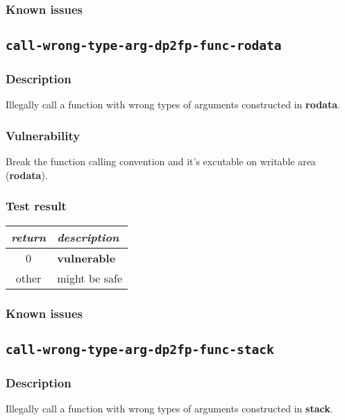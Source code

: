 \documentclass[a4paper]{book}
\begin{document}
\subsubsection{Known issues}

\newpage
\subsection{\texttt{call-wrong-type-arg-dp2fp-func-rodata}}\label{test-call-wrong-type-arg-dp2fp-func-rodata}

\subsubsection{Description}
Illegally call a function with wrong types of arguments constructed in \textbf{rodata}.

\subsubsection{Vulnerability}
Break the function calling convention and it’s excutable on writable area (\textbf{rodata}).

\subsubsection{Test result}
\begin{tabular}{cl}
  \toprule
  \emph{return}  & \emph{description} \\
  \midrule
  0              & \textbf{vulnerable} \\
  other          & might be safe \\
  \bottomrule
\end{tabular}

\subsubsection{Known issues}

\newpage

\subsection{\texttt{call-wrong-type-arg-dp2fp-func-stack}}\label{test-call-wrong-type-arg-dp2fp-func-stack}

\subsubsection{Description}
Illegally call a function with wrong types of arguments constructed in \textbf{stack}.
\end{document}
